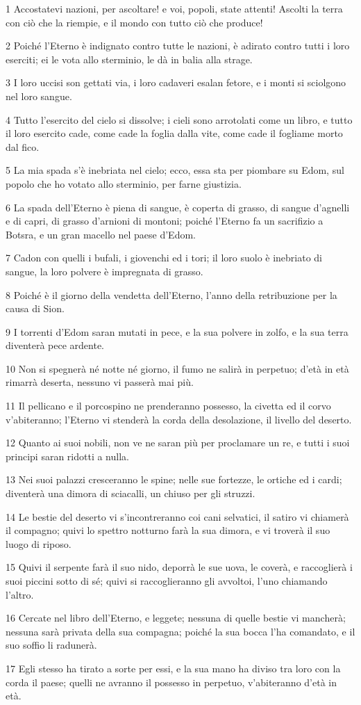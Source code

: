 \par 1 Accostatevi nazioni, per ascoltare! e voi, popoli, state attenti! Ascolti la terra con ciò che la riempie, e il mondo con tutto ciò che produce!
\par 2 Poiché l'Eterno è indignato contro tutte le nazioni, è adirato contro tutti i loro eserciti; ei le vota allo sterminio, le dà in balia alla strage.
\par 3 I loro uccisi son gettati via, i loro cadaveri esalan fetore, e i monti si sciolgono nel loro sangue.
\par 4 Tutto l'esercito del cielo si dissolve; i cieli sono arrotolati come un libro, e tutto il loro esercito cade, come cade la foglia dalla vite, come cade il fogliame morto dal fico.
\par 5 La mia spada s'è inebriata nel cielo; ecco, essa sta per piombare su Edom, sul popolo che ho votato allo sterminio, per farne giustizia.
\par 6 La spada dell'Eterno è piena di sangue, è coperta di grasso, di sangue d'agnelli e di capri, di grasso d'arnioni di montoni; poiché l'Eterno fa un sacrifizio a Botsra, e un gran macello nel paese d'Edom.
\par 7 Cadon con quelli i bufali, i giovenchi ed i tori; il loro suolo è inebriato di sangue, la loro polvere è impregnata di grasso.
\par 8 Poiché è il giorno della vendetta dell'Eterno, l'anno della retribuzione per la causa di Sion.
\par 9 I torrenti d'Edom saran mutati in pece, e la sua polvere in zolfo, e la sua terra diventerà pece ardente.
\par 10 Non si spegnerà né notte né giorno, il fumo ne salirà in perpetuo; d'età in età rimarrà deserta, nessuno vi passerà mai più.
\par 11 Il pellicano e il porcospino ne prenderanno possesso, la civetta ed il corvo v'abiteranno; l'Eterno vi stenderà la corda della desolazione, il livello del deserto.
\par 12 Quanto ai suoi nobili, non ve ne saran più per proclamare un re, e tutti i suoi principi saran ridotti a nulla.
\par 13 Nei suoi palazzi cresceranno le spine; nelle sue fortezze, le ortiche ed i cardi; diventerà una dimora di sciacalli, un chiuso per gli struzzi.
\par 14 Le bestie del deserto vi s'incontreranno coi cani selvatici, il satiro vi chiamerà il compagno; quivi lo spettro notturno farà la sua dimora, e vi troverà il suo luogo di riposo.
\par 15 Quivi il serpente farà il suo nido, deporrà le sue uova, le coverà, e raccoglierà i suoi piccini sotto di sé; quivi si raccoglieranno gli avvoltoi, l'uno chiamando l'altro.
\par 16 Cercate nel libro dell'Eterno, e leggete; nessuna di quelle bestie vi mancherà; nessuna sarà privata della sua compagna; poiché la sua bocca l'ha comandato, e il suo soffio li radunerà.
\par 17 Egli stesso ha tirato a sorte per essi, e la sua mano ha diviso tra loro con la corda il paese; quelli ne avranno il possesso in perpetuo, v'abiteranno d'età in età.

